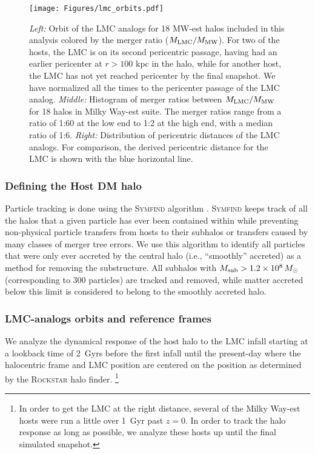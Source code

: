 \documentclass[twocolumn, linenumbers]{openjournal}
\begin{document}
\begin{figure*}[h]
    \texttt{[image: Figures/lmc\_orbits.pdf]}
    \caption[LMC Orbits and Merger Ratios]{\emph{Left:} Orbit of the LMC analogs for 18 MW-est 
    halos included in this analysis colored by the merger ratio ($M_{\rm LMC}/M_{\rm MW}$). 
    For two of the hosts, the LMC is on its second pericentric passage, having had an earlier 
    pericenter at $r > 100$ kpc in the halo, while for another host, the LMC has not yet reached 
    pericenter by the final snapshot. We have normalized all the times to the pericenter passage 
    of the LMC analog. \emph{Middle:} Histogram of merger ratios between $M_{\rm LMC}/M_{\rm MW}$ 
    for 18 halos in Milky Way-est suite. The merger ratios range from a ratio of 1:60 at the low 
    end to 1:2 at the high end, with a median ratio of 1:6. \emph{Right:} Distribution of pericentric 
    distances of the LMC analogs. For comparison, the derived pericentric distance for the LMC is 
    shown with the blue horizontal line.}\label{fig:lmc_orbits}
\end{figure*}
    


\subsubsection{Defining the Host DM halo}\label{sec:halos}


Particle tracking is done using the \textsc{Symfind} algorithm \citep{mansfield2023symfind}.  
\textsc{Symfind} keeps track of all the halos that a given particle has ever been contained within 
while preventing non-physical particle transfers from hosts to their subhalos or transfers caused 
by many classes of merger tree errors. We use this algorithm to identify all particles that were 
only ever accreted by the central halo (i.e., ``smoothly'' accreted) as a method for removing the 
substructure. All subhalos with $M_{\rm sub} > 1.2 \times 10^8\, M_\odot$ (corresponding to 300 particles) 
are tracked and removed, while matter accreted below this limit is considered to belong to the smoothly 
accreted halo.

\subsubsection{LMC-analogs orbits and reference frames}\label{sec:orbits}

We analyze the dynamical response of the host halo to the LMC infall starting at a lookback 
time of 2~Gyrs before the first infall until the present-day where the halocentric frame and LMC 
position are centered on the position as determined by the \textsc{Rockstar} halo finder. 
\footnote{In order to get the LMC at the right distance, several of the Milky Way-est hosts were 
run a little over 1~Gyr past $z=0$. In order to track the halo response as long as possible, 
we analyze these hosts up until the final simulated snapshot.} 
\end{document}
